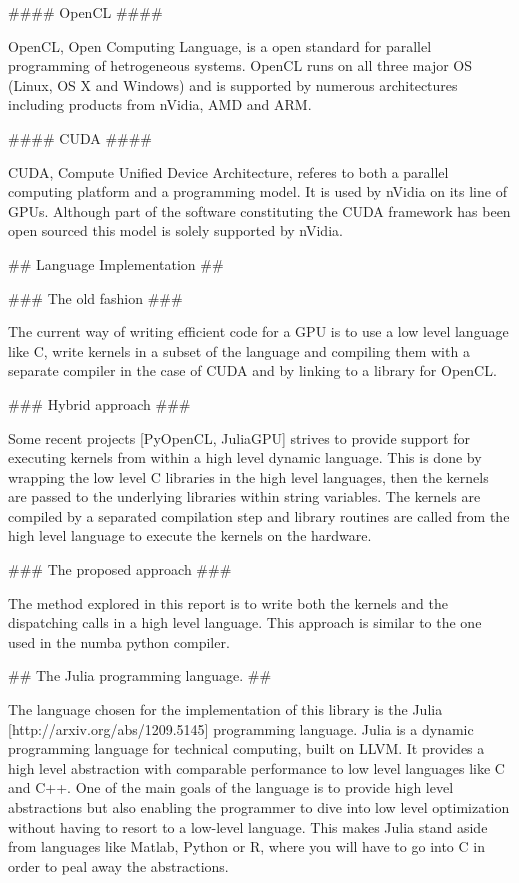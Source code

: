 \begin{markdown}
#### OpenCL ####

OpenCL, Open Computing Language, is a open standard for parallel
programming of hetrogeneous systems. OpenCL runs on all three major OS
(Linux, OS X and Windows) and is supported by numerous architectures
including products from nVidia, AMD and ARM.

#### CUDA ####

CUDA, Compute Unified Device Architecture, referes to both a parallel
computing platform and a programming model. It is used by nVidia on
its line of GPUs. Although part of the software constituting the CUDA
framework has been open sourced this model is solely supported by
nVidia.

## Language Implementation ##

### The old fashion ###

The current way of writing efficient code for a GPU is to use a low
level language like C, write kernels in a subset of the language and
compiling them with a separate compiler in the case of CUDA and by
linking to a library for OpenCL.

### Hybrid approach ###

Some recent projects [PyOpenCL, JuliaGPU] strives to provide support
for executing kernels from within a high level dynamic language. This
is done by wrapping the low level C libraries in the high level
languages, then the kernels are passed to the underlying libraries
within string variables. The kernels are compiled by a separated
compilation step and library routines are called from the high level
language to execute the kernels on the hardware.

### The proposed approach ###

The method explored in this report is to write both the kernels and the
dispatching calls in a high level language. This approach is similar
to the one used in the numba python compiler.

## The Julia programming language. ##

The language chosen for the implementation of this library is the
Julia [http://arxiv.org/abs/1209.5145] programming language. Julia is
a dynamic programming language for technical computing, built on
LLVM. It provides a high level abstraction with comparable performance
to low level languages like C and C++. One of the main goals of the
language is to provide high level abstractions but also enabling the
programmer to dive into low level optimization without having to
resort to a low-level language. This makes Julia stand aside from
languages like Matlab, Python or R, where you will have to go into C
in order to peal away the abstractions.


\end{markdown}
